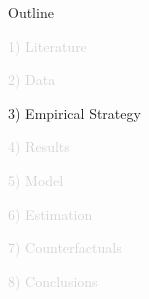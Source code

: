 \documentclass[aspectratio=169]{beamer}
\begin{document}
\begin{frame}[noframenumbering]{Outline}

\Large

\textcolor{lightgray}{1) Literature}

\vspace{3mm}

\textcolor{lightgray}{2) Data}

\vspace{3mm}

3) Empirical Strategy

\vspace{3mm}

\textcolor{lightgray}{4) Results}

\vspace{3mm}

\textcolor{lightgray}{5) Model}

\vspace{3mm}

\textcolor{lightgray}{6) Estimation}

\vspace{3mm}

\textcolor{lightgray}{7) Counterfactuals}

\vspace{3mm}

\textcolor{lightgray}{8) Conclusions}


\end{frame}

\end{document}
